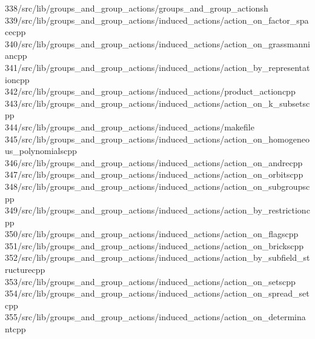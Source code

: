\begin{tabbing}
338\>/src/lib/groups\_and\_group\_actions/groups\_and\_group\_actionsh\\[0pt]
339\>/src/lib/groups\_and\_group\_actions/induced\_actions/action\_on\_factor\_spacecpp\\[0pt]
340\>/src/lib/groups\_and\_group\_actions/induced\_actions/action\_on\_grassmanniancpp\\[0pt]
341\>/src/lib/groups\_and\_group\_actions/induced\_actions/action\_by\_representationcpp\\[0pt]
342\>/src/lib/groups\_and\_group\_actions/induced\_actions/product\_actioncpp\\[0pt]
343\>/src/lib/groups\_and\_group\_actions/induced\_actions/action\_on\_k\_subsetscpp\\[0pt]
344\>/src/lib/groups\_and\_group\_actions/induced\_actions/makefile\\[0pt]
345\>/src/lib/groups\_and\_group\_actions/induced\_actions/action\_on\_homogeneous\_polynomialscpp\\[0pt]
346\>/src/lib/groups\_and\_group\_actions/induced\_actions/action\_on\_andrecpp\\[0pt]
347\>/src/lib/groups\_and\_group\_actions/induced\_actions/action\_on\_orbitscpp\\[0pt]
348\>/src/lib/groups\_and\_group\_actions/induced\_actions/action\_on\_subgroupscpp\\[0pt]
349\>/src/lib/groups\_and\_group\_actions/induced\_actions/action\_by\_restrictioncpp\\[0pt]
350\>/src/lib/groups\_and\_group\_actions/induced\_actions/action\_on\_flagscpp\\[0pt]
351\>/src/lib/groups\_and\_group\_actions/induced\_actions/action\_on\_brickscpp\\[0pt]
352\>/src/lib/groups\_and\_group\_actions/induced\_actions/action\_by\_subfield\_structurecpp\\[0pt]
353\>/src/lib/groups\_and\_group\_actions/induced\_actions/action\_on\_setscpp\\[0pt]
354\>/src/lib/groups\_and\_group\_actions/induced\_actions/action\_on\_spread\_setcpp\\[0pt]
355\>/src/lib/groups\_and\_group\_actions/induced\_actions/action\_on\_determinantcpp\\[0pt]

\end{tabbing}
